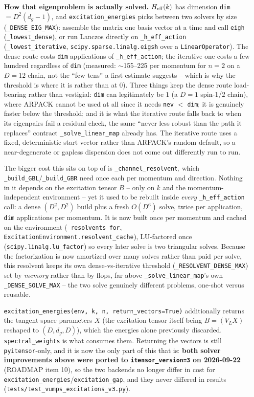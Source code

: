\documentclass[11pt]{article}
\begin{document}
\textbf{How that eigenproblem is actually solved.} $H_{\rm eff}(k)$ has
dimension \texttt{dim} $= D^2(d_g-1)$, and
\texttt{excitation\_energies} picks between two solvers by size
(\texttt{\_DENSE\_EIG\_MAX}): assemble the matrix one basis vector at a
time and call \texttt{eigh} (\texttt{\_lowest\_dense}), or run Lanczos
directly on \texttt{\_h\_eff\_action}
(\texttt{\_lowest\_iterative}, \texttt{scipy.sparse.linalg.eigsh} over
a \texttt{LinearOperator}). The dense route costs \texttt{dim}
applications of \texttt{\_h\_eff\_action}; the iterative one costs a
few hundred regardless of \texttt{dim} (measured: $\sim$155--225 per
momentum for $n=2$ on a $D=12$ chain, not the ``few tens'' a first estimate
suggests -- which is why the threshold is where it is rather than at 0). Three things keep the dense route
load-bearing rather than vestigial: \texttt{dim} can legitimately be $1$
(a $D=1$ spin-1/2 chain), where ARPACK cannot be used at all since it
needs \texttt{nev} $<$ \texttt{dim}; it is genuinely faster below the
threshold; and it is what the iterative route falls back to when its
eigenpairs fail a residual check, the same ``never less robust than the
path it replaces'' contract \texttt{\_solve\_linear\_map} already has.
The iterative route uses a fixed, deterministic start vector rather than
ARPACK's random default, so a near-degenerate or gapless dispersion does
not come out differently run to run.

The bigger cost this sits on top of is \texttt{\_channel\_resolvent},
which \texttt{\_build\_GBL}/\texttt{\_build\_GBR} need once each per
momentum and direction. Nothing in it depends on the excitation tensor
$B$ -- only on $k$ and the momentum-independent environment -- yet it used
to be rebuilt inside \emph{every} \texttt{\_h\_eff\_action} call: a
dense $(D^2, D^2)$ build plus a fresh $O(D^6)$ solve, twice per
application, \texttt{dim} applications per momentum. It is now built once
per momentum and cached on the environment
(\texttt{\_resolvents\_for}, \texttt{ExcitationEnvironment.resolvent\_cache}),
LU-factored once (\texttt{scipy.linalg.lu\_factor}) so every later solve
is two triangular solves. Because the factorization is now amortized over
many solves rather than paid per solve, this resolvent keeps its own
dense-vs-iterative threshold (\texttt{\_RESOLVENT\_DENSE\_MAX}) set by
\emph{memory} rather than by flops, far above
\texttt{\_solve\_linear\_map}'s own \texttt{\_DENSE\_SOLVE\_MAX} --
the two solve genuinely different problems, one-shot versus reusable.

\texttt{excitation\_energies(env, k, n, return\_vectors=True)}
additionally returns the tangent-space parameters $X$ (the excitation
tensor itself being $B = (V_L X)$ reshaped to $(D, d_g, D)$), which the
energies alone previously discarded. \texttt{spectral\_weights} is what
consumes them. Returning the vectors is still \texttt{pyitensor}-only,
and it is now the only part of this that is: \textbf{both solver
improvements above were ported to \texttt{itensor\_version=3} on
2026-09-22} (ROADMAP item 10), so the two backends no longer differ in
cost for
\texttt{excitation\_energies}/\texttt{excitation\_gap}, and they never
differed in results (\texttt{tests/test\_vumps\_excitations\_v3.py}).
\end{document}
